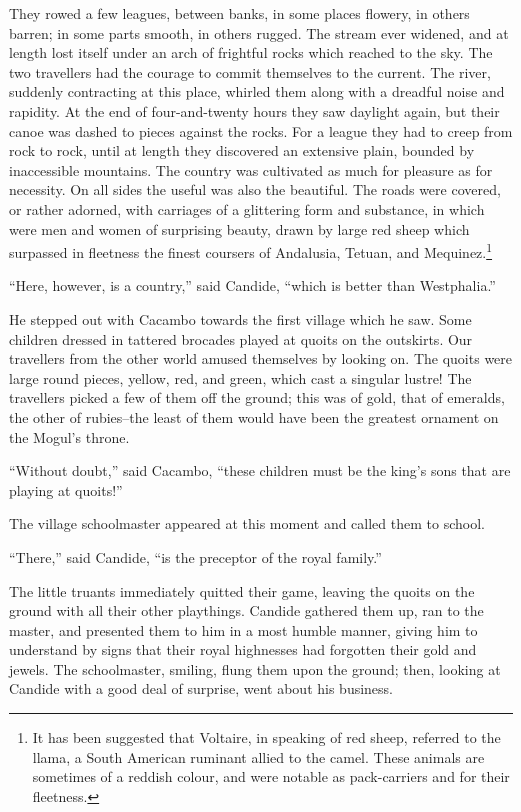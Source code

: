 They rowed a few leagues, between banks, in some places flowery, in others barren; in some parts smooth, in others rugged. The stream ever widened, and at length lost itself under an arch of frightful rocks which reached to the sky. The two travellers had the courage to commit themselves to the current. The river, suddenly contracting at this place, whirled them along with a dreadful noise and rapidity. At the end of four-and-twenty hours they saw daylight again, but their canoe was dashed to pieces against the rocks. For a league they had to creep from rock to rock, until at length they discovered an extensive plain, bounded by inaccessible mountains. The country was cultivated as much for pleasure as for necessity. On all sides the useful was also the beautiful. The roads were covered, or rather adorned, with carriages of a glittering form and substance, in which were men and women of surprising beauty, drawn by large red sheep which surpassed in fleetness the finest coursers of Andalusia, Tetuan, and Mequinez.\footnote{It has been suggested that Voltaire, in speaking of red sheep, referred to the llama, a South American ruminant allied to the camel. These animals are sometimes of a reddish colour, and were notable as pack-carriers and for their fleetness.}

``Here, however, is a country,'' said Candide, ``which is better than Westphalia.''

He stepped out with Cacambo towards the first village which he saw. Some children dressed in tattered brocades played at quoits on the outskirts. Our travellers from the other world amused themselves by looking on. The quoits were large round pieces, yellow, red, and green, which cast a singular lustre! The travellers picked a few of them off the ground; this was of gold, that of emeralds, the other of rubies--the least of them would have been the greatest ornament on the Mogul's throne.

``Without doubt,'' said Cacambo, ``these children must be the king's sons that are playing at quoits!''

The village schoolmaster appeared at this moment and called them to school.

``There,'' said Candide, ``is the preceptor of the royal family.''

The little truants immediately quitted their game, leaving the quoits on the ground with all their other playthings. Candide gathered them up, ran to the master, and presented them to him in a most humble manner, giving him to understand by signs that their royal highnesses had forgotten their gold and jewels. The schoolmaster, smiling, flung them upon the ground; then, looking at Candide with a good deal of surprise, went about his business.

